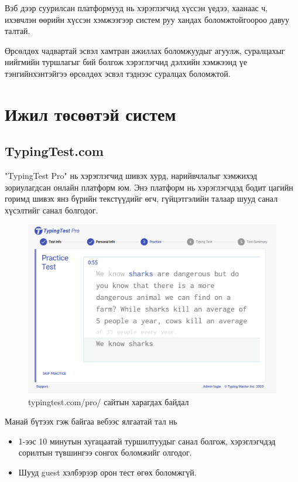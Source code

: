 Вэб дээр суурилсан платформууд нь хэрэглэгчид хүссэн үедээ, хаанаас ч, ихэвчлэн өөрийн хүссэн хэмжээгээр систем руу хандах боломжтойгоороо давуу талтай.

Өрсөлдөх чадвартай эсвэл хамтран ажиллах боломжуудыг агуулж, суралцахыг нийгмийн туршлагыг бий болгож хэрэглэгчид дэлхийн хэмжээнд үе тэнгийнхэнтэйгээ өрсөлдөх эсвэл тэднээс суралцах боломжтой.
\section{Ижил төсөөтэй систем}

\subsection{TypingTest.com}

"TypingTest Pro" нь хэрэглэгчид шивэх хурд, нарийвчлалыг хэмжихэд зориулагдсан онлайн платформ юм. Энэ платформ нь хэрэглэгчдэд бодит цагийн горимд шивэх янз бүрийн текстүүдийг өгч, гүйцэтгэлийн талаар шууд санал хүсэлтийг санал болгодог.

\begin{figure}[h]
	\centering
	\includegraphics[width=15cm]{images/typingtestpro.png}
	\caption{typingtest.com/pro/ сайтын харагдах байдал}
	\label{fig:alltop}
\end{figure}

Манай бүтээх гэж байгаа вебээс ялгаатай тал нь
\begin{itemize}
	\item 1-ээс 10 минутын хугацаатай туршилтуудыг санал болгож, хэрэглэгчдэд сорилтын түвшингээ сонгох боломжийг олгодог.
	\item Шууд guest хэлбэрээр орон тест өгөх боломжгүй.
\end{itemize}

